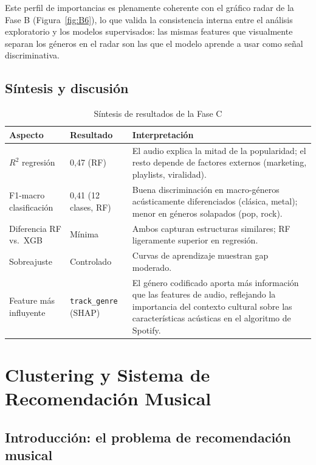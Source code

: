 \documentclass[12pt, a4paper, twoside]{book}
\theoremstyle{definition}
\begin{document}
Este perfil de importancias es plenamente coherente con el gráfico radar de
la Fase B (Figura~\ref{fig:B6}), lo que valida la consistencia interna entre
el análisis exploratorio y los modelos supervisados: las mismas features que
visualmente separan los géneros en el radar son las que el modelo aprende a
usar como señal discriminativa.

\section{Síntesis y discusión}

\begin{table}[H]
\centering
\caption{Síntesis de resultados de la Fase C}
\label{tab:discusion_C}
\small
{}
\begin{tabular}{p{3.2cm}p{3.8cm}p{6cm}}
\toprule
\textbf{Aspecto} & \textbf{Resultado} & \textbf{Interpretación} \\
\midrule
$R^2$ regresión & 0{,}47 (RF) & El audio explica la mitad de la popularidad;
  el resto depende de factores externos (marketing, playlists, viralidad). \\
F1-macro clasificación & 0{,}41 (12 clases, RF) & Buena discriminación en macro-géneros
  acústicamente diferenciados (clásica, metal); menor en géneros solapados (pop, rock). \\
Diferencia RF vs.\ XGB & Mínima & Ambos capturan estructuras similares; RF
  ligeramente superior en regresión. \\
Sobreajuste & Controlado & Curvas de aprendizaje muestran gap moderado. \\
Feature más influyente & \texttt{track\_genre} (SHAP) & El género codificado aporta
  más información que las features de audio, reflejando la importancia del contexto
  cultural sobre las características acústicas en el algoritmo de Spotify. \\
\bottomrule
\end{tabular}
\end{table}

\chapter{Clustering y Sistema de Recomendación Musical}
\label{ch:clustering}

\section{Introducción: el problema de recomendación musical}
\end{document}
